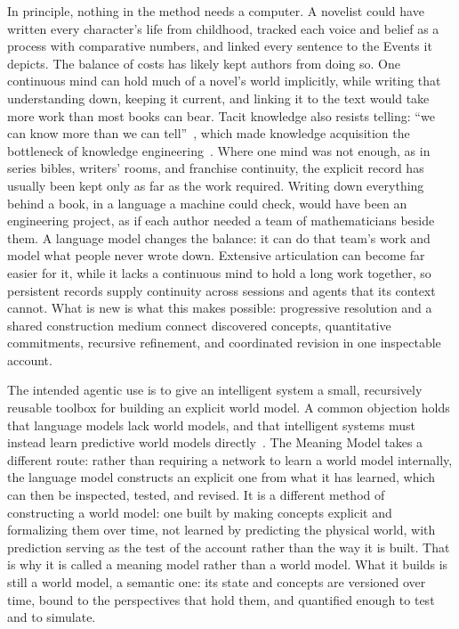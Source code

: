 \documentclass[11pt,a4paper]{article}
\begin{document}
In principle, nothing in the method needs a computer. A novelist could have written every
character's life from childhood, tracked each voice and belief as a process with
comparative numbers, and linked every sentence to the Events it depicts. The
balance of costs has likely kept authors from doing so. One continuous mind can hold
much of a novel's world implicitly, while writing that understanding down,
keeping it current, and linking it to the text would take more work than most
books can bear. Tacit knowledge also resists telling: ``we can know more than we
can tell''~\cite[p.~4]{polanyi1966tacit}, which made knowledge acquisition the
bottleneck of knowledge engineering~\cite{feigenbaum1977art}. Where one mind was not enough, as in series bibles,
writers' rooms, and franchise continuity, the explicit record has usually been
kept only as far as the work required. Writing down everything behind a book, in
a language a machine could check, would have been an engineering project, as if
each author needed a team of mathematicians beside them. A language model changes
the balance: it can do that team's work and model what people never wrote down.
Extensive articulation can become far easier for it, while it lacks a continuous
mind to hold a long work together, so persistent records supply continuity
across sessions and agents that its context cannot. What is new is what this makes
possible: progressive resolution and a shared construction medium connect
discovered concepts, quantitative commitments, recursive refinement, and
coordinated revision in one inspectable account.

The intended agentic use is to give an intelligent system a small, recursively
reusable toolbox for building an explicit world model. A common objection holds
that language models lack world models, and that intelligent systems must
instead learn predictive world models directly~\cite{lecun2022path}. The
Meaning Model takes a different route: rather than requiring a network to learn
a world model internally, the language model constructs an explicit one from
what it has learned, which can then be inspected, tested, and revised. It is a
different method of constructing a world model: one built by making concepts
explicit and formalizing them over time, not learned by predicting the physical
world, with prediction serving as the test of the account rather than the way
it is built. That is why it is called a meaning model rather than a world model.
What it builds is still a world model, a semantic one: its state and concepts
are versioned over time, bound to the perspectives that hold them, and
quantified enough to test and to simulate.
\end{document}
